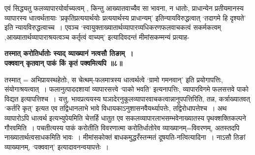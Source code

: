 एवं सिद्ध्यतु फलव्यापारयोर्वाच्यत्वम् , किन्तु आख्यातवाच्यैव सा भावना, न धातोः, प्राधान्येन प्रतीयमानस्य व्यापारस्य धात्वर्थतायाः 'प्रकृतिप्रत्ययार्थयोः प्रत्ययार्थस्य प्राधान्यम्' इतिन्यायविरुद्धत्वात् `तदागमे हि दृश्यते' इति न्यायविरुद्धत्वाच्च~।
एवञ्च `स्वायुक्ताख्यातार्थव्यापारव्यधिकरणफलवाचकत्वं सकर्मकत्वम् ,आख्यातार्थव्यापाराश्रयत्वञ्च कर्तृत्वं वाच्यम्' इत्यादिवदन्तं मीमांसकम्मन्यं प्रत्याह-
\begin{center}{\bfseries तस्मात् करोतिर्धातोः स्याद् व्याख्यानं नत्वसौ तिङाम्~।\\
पक्ववान् कृतवान् पाकं किं कृतं पक्वमित्यपि ॥८॥}
\end{center}
 तस्मात् = अभिप्रायस्थहेतोः, स चेत्थम्-फलमात्रस्य धात्वर्थत्वे `ग्रामो गमनवान्' इति प्रयोगापत्तिः, संयोगाश्रयत्वात्~।
फलानुत्पाददशायां व्यापारसत्त्वे `पाको भवति' इत्यनापत्तिः, व्यापारविगमे फलसत्तवे पाको विद्यत इत्यापत्तिश्च~।
 यत्तु, भावप्रत्ययस्य घञादेरनुकूलव्यापारवाचकत्वान्नानुपपत्तिरिति, तन्न, कर्त्राख्यातवत् `कर्तरि कृत्' इत्यत एव तद्विधानलाभे भावे विधायकाऽनुशासनवैयर्थ्यापत्तेः, तद्विरोधापत्तेश्च~।
अथ व्यापारोऽपि धात्वर्थ इत्यभ्युपेयमिति चेत्तर्हि धातुत एव सकलव्यापारलाभसम्भवेनाख्यातस्य पृथक्शक्तिकल्पने गौरवमिति~।
पचतीत्यस्य पाकं करोतीति विवरणात्मा करोतिर्धातोरेव व्याख्यानम्=विवरणम्, अतस्तदपि नाख्यातार्थत्वसाधकमिति भावः~।
मीमांसकोक्तं बाधकमुद्धरँस्तन्मतं दूषयति-नत्वित्यादिना~।
 नाऽसौ तिङां व्याख्यानम्, `पक्ववान्' इत्यादावनन्वयापत्तेः~।
